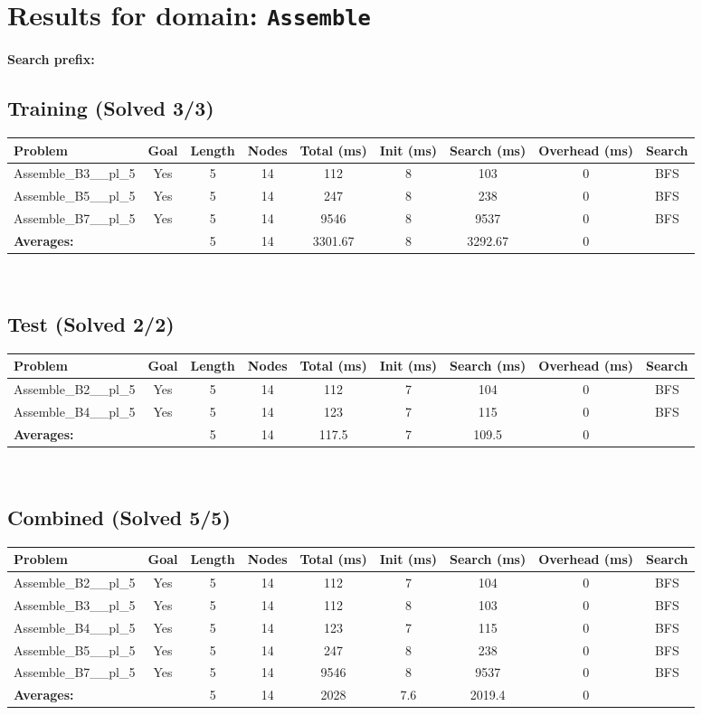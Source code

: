 \documentclass{article}
\begin{document}
\section*{Results for domain: \texttt{Assemble}}
\textbf{Search prefix:} 
\\[0.5cm]
\subsection*{Training (Solved 3/3)}
\begin{tabular}{lcccccccc}
\toprule
Problem & Goal & Length & Nodes & Total (ms) & Init (ms) & Search (ms) & Overhead (ms) & Search \\
\midrule
Assemble\_B3\_\_pl\_5 & Yes & 5 & 14 & 112 & 8 & 103 & 0 & BFS \\
Assemble\_B5\_\_pl\_5 & Yes & 5 & 14 & 247 & 8 & 238 & 0 & BFS \\
Assemble\_B7\_\_pl\_5 & Yes & 5 & 14 & 9546 & 8 & 9537 & 0 & BFS \\
\textbf{Averages:} & & 5 & 14 & 3301.67 & 8 & 3292.67 & 0 & \\
\bottomrule
\end{tabular}
\\[0.7cm]
\subsection*{Test (Solved 2/2)}
\begin{tabular}{lcccccccc}
\toprule
Problem & Goal & Length & Nodes & Total (ms) & Init (ms) & Search (ms) & Overhead (ms) & Search \\
\midrule
Assemble\_B2\_\_pl\_5 & Yes & 5 & 14 & 112 & 7 & 104 & 0 & BFS \\
Assemble\_B4\_\_pl\_5 & Yes & 5 & 14 & 123 & 7 & 115 & 0 & BFS \\
\textbf{Averages:} & & 5 & 14 & 117.5 & 7 & 109.5 & 0 & \\
\bottomrule
\end{tabular}
\\[0.7cm]
\subsection*{Combined (Solved 5/5)}
\begin{tabular}{lcccccccc}
\toprule
Problem & Goal & Length & Nodes & Total (ms) & Init (ms) & Search (ms) & Overhead (ms) & Search \\
\midrule
Assemble\_B2\_\_pl\_5 & Yes & 5 & 14 & 112 & 7 & 104 & 0 & BFS \\
Assemble\_B3\_\_pl\_5 & Yes & 5 & 14 & 112 & 8 & 103 & 0 & BFS \\
Assemble\_B4\_\_pl\_5 & Yes & 5 & 14 & 123 & 7 & 115 & 0 & BFS \\
Assemble\_B5\_\_pl\_5 & Yes & 5 & 14 & 247 & 8 & 238 & 0 & BFS \\
Assemble\_B7\_\_pl\_5 & Yes & 5 & 14 & 9546 & 8 & 9537 & 0 & BFS \\
\textbf{Averages:} & & 5 & 14 & 2028 & 7.6 & 2019.4 & 0 & \\
\bottomrule
\end{tabular}
\\[0.7cm]
\end{document}
